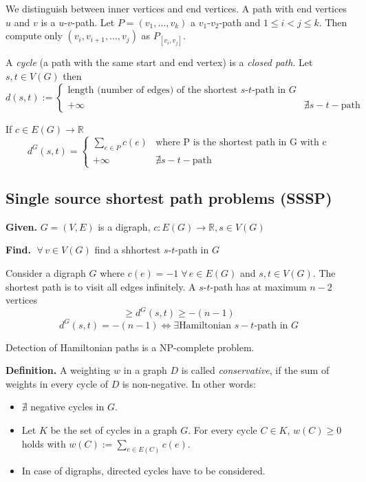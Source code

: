 \documentclass{article}
\newcommand{\given}[1]{\textbf{Given.} #1\par}
\newcommand{\find}[1]{\textbf{Find.} #1\par}
\newcommand{\gath}[2]{$#1$-$#2$-path} %
\newcommand{\fall}{\;\forall\,}
\begin{document}
We distinguish between inner vertices and end vertices. A path with end vertices $u$ and $v$ is a \gath uv. Let $P = (v_1, \ldots, v_k)$ a \gath{v_1}{v_2} and $1 \leq i < j \leq k$. Then compute only $(v_i, v_{i+1}, \ldots, v_j)$ as $P_{[v_i, v_j]}$.

A \emph{cycle} (a path with the same start and end vertex) is a \emph{closed path}. Let $s, t \in V(G)$ then
\[
  d(s, t) := \left\{\begin{array}{lc}
    \text{length (number of edges) of the shortest \gath st in $G$} & \\
    +\infty & \nexists s-t-\text{path}
  \end{array}\right.
\]

If $c \in E(G) \rightarrow \mathbb{R}$
\[
    d^G(s, t) = \left\{\begin{array}{lc}
      \sum_{e \in P} c(e) & \text{where P is the shortest path in G with c} \\
      +\infty & \nexists s-t-\text{path}
    \end{array}\right.
\]

\subsection{Single source shortest path problems (SSSP)}
%
\given{$G=(V,E)$ is a digraph, $c: E(G) \rightarrow \mathbb{R}, s \in V(G)$}
\find{$\fall v \in V(G)$ find a shhortest \gath st in $G$}

Consider a digraph $G$ where $c(e) = -1 \fall e \in E(G)$ and $s,t \in V(G)$. The shortest path is to visit all edges infinitely. A \gath st has at maximum $n-2$ vertices
\[
    \geq d^G(s, t) \geq -(n - 1)
\] \[
    d^G(s, t) = -(n - 1) \Leftrightarrow \exists \text{Hamiltonian $s-t$-path in $G$}
\]

Detection of Hamiltonian paths is a NP-complete problem.

\textbf{Definition.}
  A weighting $w$ in a graph $D$ is called \emph{conservative}, if the sum of weights in every cycle of $D$ is non-negative. In other words:
  \begin{itemize}
    \item $\nexists$ negative cycles in $G$.
    \item Let $K$ be the set of cycles in a graph $G$. For every cycle $C \in K$, $w(C) \geq 0$ holds with $w(C) := \sum_{e \in E(C)} c(e)$.
    \item In case of digraphs, directed cycles have to be considered.
  \end{itemize}
\end{document}
